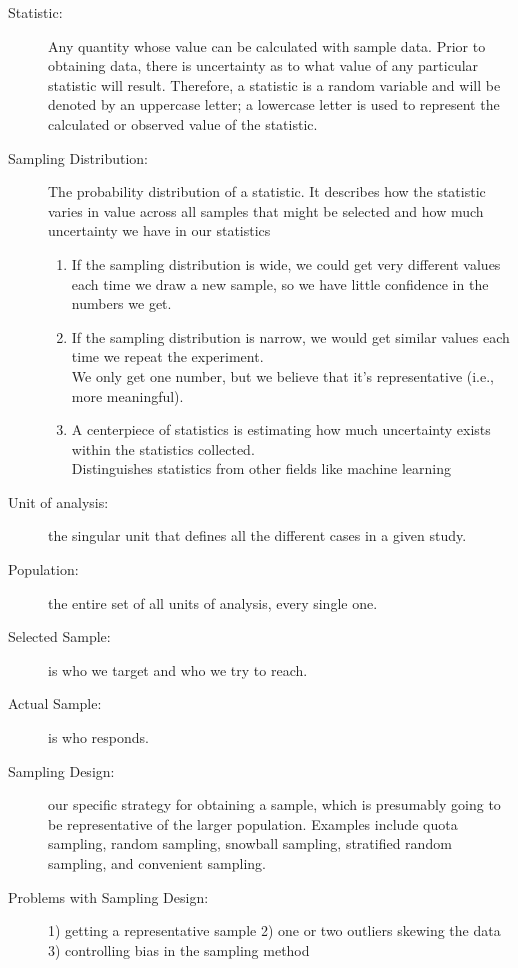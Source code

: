 \documentclass[10pt,landscape]{article}
\begin{document}
\begin{multicols}{3}
\begin{description}
\item[Statistic:] Any quantity whose value can be calculated with sample data. Prior to obtaining data, there is uncertainty as to what value of any particular statistic will result. Therefore, a statistic is a random variable and will be denoted by an uppercase letter; a lowercase letter is used to represent the calculated or observed value of the statistic.\\
\item[Sampling Distribution:] The probability distribution of a statistic. It describes how the statistic varies in value across all samples that might be selected and how much uncertainty we have in our statistics\\
\begin{enumerate}
  \item If the sampling distribution is wide, we could get very different values each time we draw a new sample, so we have little confidence in the numbers we get.
  \item If the sampling distribution is narrow, we would get similar values each time we repeat the experiment.\\
      We only get one number, but we believe that it's representative (i.e., more meaningful).
  \item A centerpiece of statistics is estimating how much uncertainty exists within the statistics collected.\\
      Distinguishes statistics from other fields like machine learning
\end{enumerate}
\item[Unit of analysis:] the singular unit that defines all the different cases in a given study.
\item[Population:] the entire set of all units of analysis, every single one.\\
\item[Selected Sample:] is who we target and who we try to reach.\\
\item[Actual Sample:] is who responds.\\
\item[Sampling Design:] our specific strategy for obtaining a sample, which is presumably going to be representative of the larger population. Examples include quota sampling, random sampling, snowball sampling, stratified random sampling, and convenient sampling.
\item[Problems with Sampling Design:] 1) getting a representative sample 2) one or two outliers skewing the data 3) controlling bias in the sampling method

\end{description}
\end{multicols}
\end{document}
